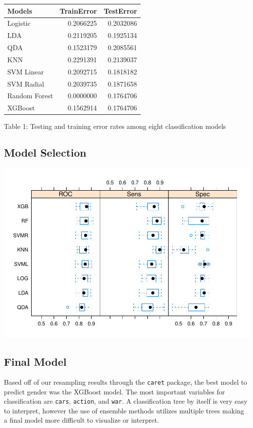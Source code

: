 \documentclass[]{article}
\begin{document}
\begin{longtable}[]{@{}lrr@{}}
\toprule
Models & TrainError & TestError\tabularnewline
\midrule
\endhead
Logistic & 0.2066225 & 0.2032086\tabularnewline
LDA & 0.2119205 & 0.1925134\tabularnewline
QDA & 0.1523179 & 0.2085561\tabularnewline
KNN & 0.2291391 & 0.2139037\tabularnewline
SVM Linear & 0.2092715 & 0.1818182\tabularnewline
SVM Radial & 0.2039735 & 0.1871658\tabularnewline
Random Forest & 0.0000000 & 0.1764706\tabularnewline
XGBoost & 0.1562914 & 0.1764706\tabularnewline
\bottomrule
\end{longtable}

Table 1: Testing and training error rates among eight classification
models

\subsection{Model Selection}\label{model-selection}

\includegraphics{final_report_files/figure-latex/unnamed-chunk-13-1.pdf}

\subsection{Final Model}\label{final-model}

Based off of our resampling results through the \texttt{caret} package,
the best model to predict gender was the XGBoost model. The most
important variables for classification are \texttt{cars},
\texttt{action}, and \texttt{war}. A classification tree by itself is
very easy to interpret, however the use of ensemble methods utilizes
multiple trees making a final model more difficult to visualize or
interpret.
\end{document}
